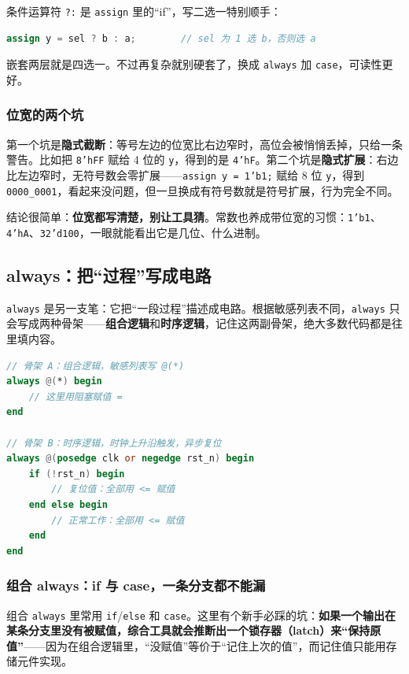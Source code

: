 条件运算符 \texttt{?:} 是 \texttt{assign} 里的“if”，写二选一特别顺手：

\begin{lstlisting}[language=Verilog,numbers=none]
assign y = sel ? b : a;        // sel 为 1 选 b，否则选 a
\end{lstlisting}

嵌套两层就是四选一。不过再复杂就别硬套了，换成 \texttt{always} 加 \texttt{case}，可读性更好。

\subsubsection*{位宽的两个坑}

第一个坑是\textbf{隐式截断}：等号左边的位宽比右边窄时，高位会被悄悄丢掉，只给一条警告。比如把 \texttt{8'hFF} 赋给 4 位的 \texttt{y}，得到的是 \texttt{4'hF}。第二个坑是\textbf{隐式扩展}：右边比左边窄时，无符号数会零扩展——\texttt{assign y = 1'b1;} 赋给 8 位 \texttt{y}，得到 \texttt{0000\_0001}，看起来没问题，但一旦换成有符号数就是符号扩展，行为完全不同。

结论很简单：\textbf{位宽都写清楚，别让工具猜}。常数也养成带位宽的习惯：\texttt{1'b1}、\texttt{4'hA}、\texttt{32'd100}，一眼就能看出它是几位、什么进制。

\subsection{always：把“过程”写成电路}

\texttt{always} 是另一支笔：它把“一段过程”描述成电路。根据敏感列表不同，\texttt{always} 只会写成两种骨架——\textbf{组合逻辑}和\textbf{时序逻辑}，记住这两副骨架，绝大多数代码都是往里填内容。

\begin{lstlisting}[language=Verilog,numbers=none]
// 骨架 A：组合逻辑，敏感列表写 @(*)
always @(*) begin
    // 这里用阻塞赋值 =
end

// 骨架 B：时序逻辑，时钟上升沿触发，异步复位
always @(posedge clk or negedge rst_n) begin
    if (!rst_n) begin
        // 复位值：全部用 <= 赋值
    end else begin
        // 正常工作：全部用 <= 赋值
    end
end
\end{lstlisting}

\subsubsection*{组合 always：if 与 case，一条分支都不能漏}

组合 \texttt{always} 里常用 \texttt{if}/\texttt{else} 和 \texttt{case}。这里有个新手必踩的坑：\textbf{如果一个输出在某条分支里没有被赋值，综合工具就会推断出一个锁存器（latch）来“保持原值”}——因为在组合逻辑里，“没赋值”等价于“记住上次的值”，而记住值只能用存储元件实现。

